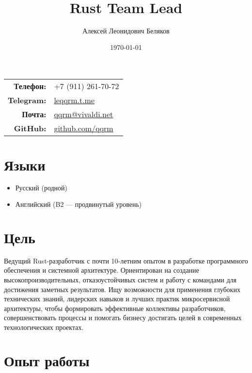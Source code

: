 \documentclass[a4paper,12pt]{article}
\title{\textbf{Rust Team Lead}}
\author{Алексей Леонидович Беляков}
\date{\today}
\begin{document}
\maketitle

\begin{center}
    \begin{tabular}{rl}
        \textbf{Телефон:} & +7 (911) 261-70-72 \\
        \textbf{Telegram:} & \href{https://leqqrm.t.me}{leqqrm.t.me} \\
        \textbf{Почта:} & \href{mailto:qqrm@vivaldi.net}{qqrm@vivaldi.net} \\
        \textbf{GitHub:} & \href{https://github.com/qqrm}{github.com/qqrm} \\
    \end{tabular}
\end{center}

\vspace{5mm}

\section*{Языки}
\begin{itemize}[leftmargin=15pt]
    \item Русский (родной)
    \item Английский (B2 — продвинутый уровень)
\end{itemize}

\section*{Цель}
Ведущий Rust-разработчик с почти 10-летним опытом в разработке программного обеспечения и системной архитектуре. Ориентирован на создание высокопроизводительных, отказоустойчивых систем и работу с командами для достижения заметных результатов. Ищу возможности для применения глубоких технических знаний, лидерских навыков и лучших практик микросервисной архитектуры, чтобы формировать эффективные коллективы разработчиков, совершенствовать процессы и помогать бизнесу достигать целей в современных технологических проектах.

\section*{Опыт работы}
\end{document}
